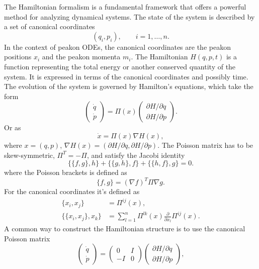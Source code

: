 \documentclass[english,master]{liumaiex}
\theoremstyle{plain}
\theoremstyle{definition}
\begin{document}
The Hamiltonian formalism is a fundamental framework that offers a powerful method for analyzing dynamical systems. The state of the system is described by a set of canonical coordinates
\begin{equation}
	 (q_i,p_i), \qquad i = 1,\dots,n.
\end{equation}
In the context of peakon ODEs, the canonical coordinates are the peakon positions $x_i$ and the peakon momenta $m_i$. The Hamiltonian $H(q,p,t)$ is a function representing the total energy or another conserved quantity of the system. It is expressed in terms of the canonical coordinates and possibly time. The evolution of the system is governed by Hamilton's equations, which take the form
%
\begin{equation}
\begin{pmatrix}
	\dot{q} \\
	\dot{p}
\end{pmatrix} =
\Pi(x)
\begin{pmatrix}
	\partial H / \partial q \\
	\partial H / \partial p
\end{pmatrix}.
\end{equation}
%
Or as
%
\begin{equation}
	\dot{x} = \Pi(x) \nabla H(x),
\end{equation}
%
where $x = (q,p)$, $\nabla H(x) = (\partial H / \partial q, \partial H / \partial p)$. 
The Poisson matrix has to be skew-symmetric, $\Pi^T = -\Pi$, and satisfy the Jacobi identity
\begin{equation}
	\{\{f,g\},h\} + \{\{g,h\},f\} + \{\{h,f\},g\} = 0.
\end{equation}
%
where the Poisson brackets is defined as
%
\begin{equation}
	\{f,g\} = (\nabla f)^T \Pi \nabla g.	
\end{equation}
%
For the canonical coordinates it's defined as
%
\begin{align}
	\{x_i, x_j\} &= \Pi^{ij}(x), \\
	\{\{x_i, x_j\}, x_k\} &= \sum_{l=1}^n \Pi^{lk}(x) \frac{\partial}{\partial x_l} \Pi^{ij}(x).
\end{align}
%
A common way to construct the Hamiltonian structure is to use the canonical Poisson matrix
%
\begin{equation}
\begin{pmatrix}
	\dot{q} \\
	\dot{p}
\end{pmatrix} =
\begin{pmatrix}
	0 & I \\
	-I & 0
\end{pmatrix}
\begin{pmatrix}
	\partial H / \partial q \\
	\partial H / \partial p
\end{pmatrix},
\end{equation}
\end{document}
